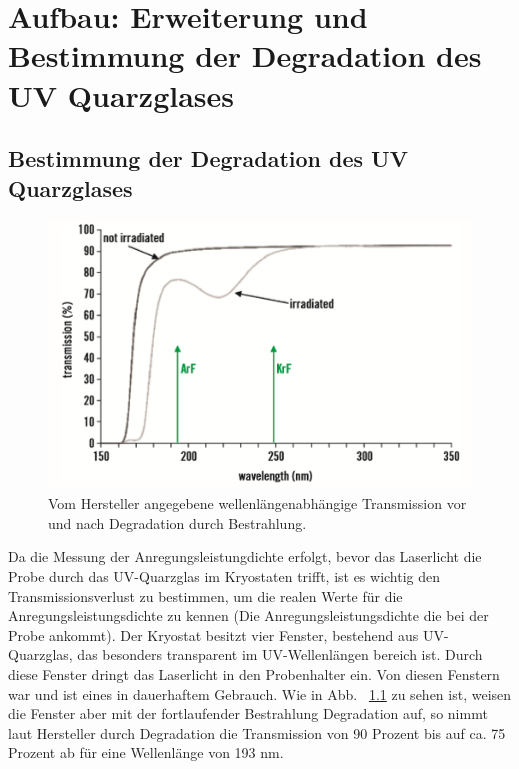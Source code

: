 \chapter{Aufbau: Erweiterung und Bestimmung der Degradation des UV Quarzglases }
\thispagestyle{fancy}

\section{Bestimmung der Degradation des UV Quarzglases}
%
\begin{figure}[htb]
  \centering
  \begin{minipage}[t]{0.49\linewidth}
      \centering
      \includegraphics[width=\linewidth]{Bilder/uvsilicaDegradation.png}
      \caption{Vom Hersteller angegebene wellenlängenabhängige Transmission vor und nach Degradation durch Bestrahlung.}
      \label{fig:degra}
  \end{minipage}
\end{figure}
\vspace{1cm}
\raggedright
Da die Messung der Anregungsleistungdichte erfolgt, bevor das Laserlicht die Probe durch das UV-Quarzglas im Kryostaten trifft, ist es wichtig den Transmissionsverlust zu bestimmen, um die realen Werte für die Anregungsleistungsdichte zu kennen (Die Anregungsleistungsdichte die bei der Probe ankommt). Der Kryostat besitzt vier Fenster, bestehend aus UV-Quarzglas, das besonders transparent im UV-Wellenlängen bereich ist. Durch diese Fenster dringt das Laserlicht in den Probenhalter ein. Von diesen Fenstern war und ist eines in dauerhaftem Gebrauch. Wie in Abb. ~\ref{fig:degra} zu sehen ist, weisen die Fenster aber mit der fortlaufender Bestrahlung Degradation auf, so nimmt laut Hersteller durch Degradation die Transmission von 90 Prozent bis auf ca. 75 Prozent ab für eine Wellenlänge von 193 nm.
